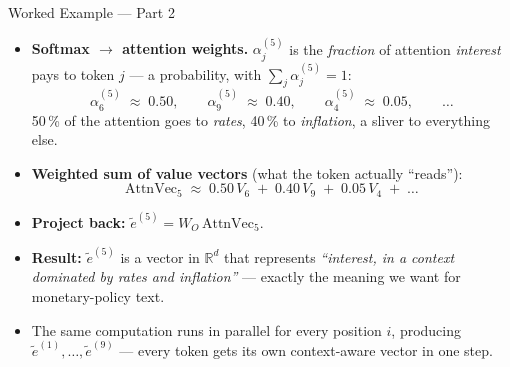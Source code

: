 \documentclass[10pt,english,aspectratio=169]{beamer}
\begin{document}
\begin{frame}{Worked Example --- Part 2}
\begin{itemize}
\item \textbf{Softmax $\to$ attention weights.} $\alpha_{j}^{(5)}$ is the \emph{fraction} of attention \emph{interest} pays to token $j$ --- a probability, with $\sum_{j}\alpha_{j}^{(5)} = 1$:
\[
   \alpha_{6}^{(5)} \;\approx\; 0.50, \qquad
   \alpha_{9}^{(5)} \;\approx\; 0.40, \qquad
   \alpha_{4}^{(5)} \;\approx\; 0.05, \qquad
   \ldots
\]
50\,\% of the attention goes to \emph{rates}, 40\,\% to \emph{inflation}, a sliver to everything else.

\medskip
\item \textbf{Weighted sum of value vectors} (what the token actually ``reads''):
\[
   \text{AttnVec}_{5} \;\approx\; 0.50\,V_{6} \;+\; 0.40\,V_{9} \;+\; 0.05\,V_{4} \;+\; \ldots
\]

\medskip
\item \textbf{Project back:} $\tilde{e}^{(5)} = W_{O}\,\text{AttnVec}_{5}$.

\medskip
\item \textbf{Result:} $\tilde{e}^{(5)}$ is a vector in $\mathbb{R}^{d}$ that represents \emph{``interest, in a context dominated by rates and inflation''} --- exactly the meaning we want for monetary-policy text.

\medskip
\item The same computation runs in parallel for every position $i$, producing $\tilde{e}^{(1)}, \ldots, \tilde{e}^{(9)}$ --- every token gets its own context-aware vector in one step.
\end{itemize}
\end{frame}
\end{document}
